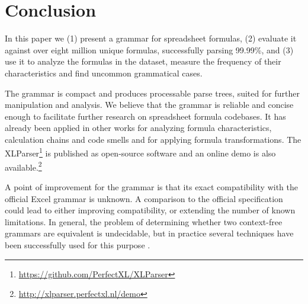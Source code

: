 \documentclass[times]{smrauth}
\begin{document}
\section{Conclusion}
\label{section:conclusion}
In this paper we (1) present a grammar for spreadsheet formulas, (2) evaluate it against over eight million unique formulas, successfully parsing 99.99\%, and (3) use it to analyze the formulas in the dataset, measure the frequency of their characteristics and find uncommon grammatical cases.

The grammar is compact and produces processable parse trees, suited for further manipulation and analysis. We believe that the grammar is reliable and concise enough to facilitate further research on spreadsheet formula codebases. It has already been applied in other works for analyzing formula characteristics, calculation chains and code smells and for applying formula transformations. The XLParser\footnote{\url{https://github.com/PerfectXL/XLParser}} is published as open-source software and an online demo is also available.\footnote{\url{http://xlparser.perfectxl.nl/demo}}

A point of improvement for the grammar is that its exact compatibility with the official Excel grammar is unknown.
A comparison to the official specification could lead to either improving compatibility, or extending the number of known limitations.
In general, the problem of determining whether two context-free grammars are equivalent is undecidable, but in practice several techniques have been successfully used for this purpose \cite{lammel2009introduction,fischer2012comparison}.



\end{document}
